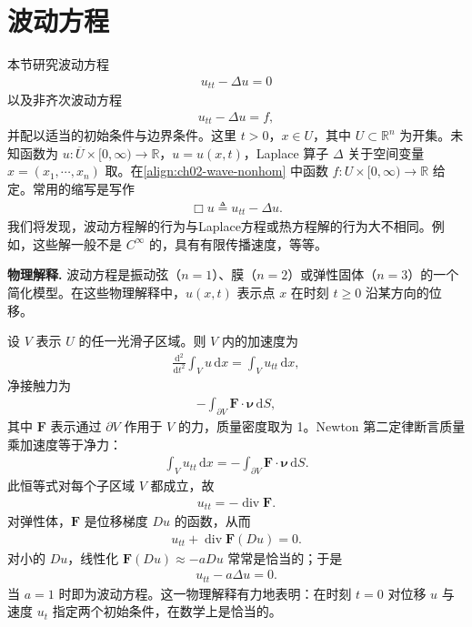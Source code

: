 \documentclass[../../main.tex]{subfiles}
\begin{document}
\section{波动方程}\label{section:ch02-wave}

本节研究波动方程
\begin{align}\label{align:ch02-wave}
u_{tt}-\Delta u=0
\end{align}
以及非齐次波动方程
\begin{align}\label{align:ch02-wave-nonhom}
u_{tt}-\Delta u=f,
\end{align}
并配以适当的初始条件与边界条件。这里 $t>0$，$x\in U$，其中 $U\subset\mathbb{R}^n$ 为开集。未知函数为 $u:\overline{U}\times[0,\infty)\to\mathbb{R}$，$u=u(x,t)$，Laplace 算子 $\Delta$ 关于空间变量 $x=(x_1,\cdots,x_n)$ 取。在\eqref{align:ch02-wave-nonhom} 中函数 $f:U\times[0,\infty)\to\mathbb{R}$ 给定。常用的缩写是写作
\begin{align*}
\Box u\triangleq u_{tt}-\Delta u.
\end{align*}
我们将发现，波动方程解的行为与Laplace方程或热方程解的行为大不相同。例如，这些解一般不是 $C^\infty$ 的，具有有限传播速度，等等。

\textbf{物理解释.} 波动方程是振动弦（$n=1$）、膜（$n=2$）或弹性固体（$n=3$）的一个简化模型。在这些物理解释中，$u(x,t)$ 表示点 $x$ 在时刻 $t\geqslant 0$ 沿某方向的位移。

设 $V$ 表示 $U$ 的任一光滑子区域。则 $V$ 内的加速度为
\begin{align*}
\frac{\mathrm{d}^2}{\mathrm{d}t^2}\int_V u\,\mathrm{d}x=\int_V u_{tt}\,\mathrm{d}x,
\end{align*}
净接触力为
\begin{align*}
-\int_{\partial V}\mathbf{F}\cdot\boldsymbol{\nu}\,\mathrm{d}S,
\end{align*}
其中 $\mathbf{F}$ 表示通过 $\partial V$ 作用于 $V$ 的力，质量密度取为 1。Newton 第二定律断言质量乘加速度等于净力：
\begin{align*}
\int_V u_{tt}\,\mathrm{d}x=-\int_{\partial V}\mathbf{F}\cdot\boldsymbol{\nu}\,\mathrm{d}S.
\end{align*}
此恒等式对每个子区域 $V$ 都成立，故
\begin{align*}
u_{tt}=-\operatorname{div}\mathbf{F}.
\end{align*}
对弹性体，$\mathbf{F}$ 是位移梯度 $Du$ 的函数，从而
\begin{align*}
u_{tt}+\operatorname{div}\mathbf{F}(Du)=0.
\end{align*}
对小的 $Du$，线性化 $\mathbf{F}(Du)\approx-aDu$ 常常是恰当的；于是
\begin{align*}
u_{tt}-a\Delta u=0.
\end{align*}
当 $a=1$ 时即为波动方程。这一物理解释有力地表明：在时刻 $t=0$ 对位移 $u$ 与速度 $u_t$ 指定两个初始条件，在数学上是恰当的。
\end{document}
